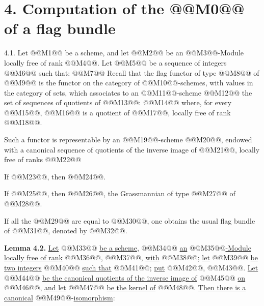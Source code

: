 \section*{4. Computation of the @@M0@@ of a flag bundle}

4.1.
Let @@M1@@ be a scheme, and let @@M2@@ be an @@M3@@-Module locally free of rank @@M4@@. Let @@M5@@ be a sequence of integers @@M6@@ such that:
@@M7@@
Recall that the flag functor of type @@M8@@ of @@M9@@ is the functor on the category of @@M10@@-schemes, with values in the category of sets, which associates to an @@M11@@-scheme @@M12@@ the set of sequences of quotients of @@M13@@:
@@M14@@
where, for every @@M15@@, @@M16@@ is a quotient of @@M17@@, locally free of rank @@M18@@.

Such a functor is representable by an @@M19@@-scheme @@M20@@, endowed with a canonical sequence of quotients of the inverse image of @@M21@@, locally free of ranks @@M22@@

If @@M23@@, then @@M24@@.

If @@M25@@, then @@M26@@, the Grassmannian of type @@M27@@ of @@M28@@.

If all the @@M29@@ are equal to @@M30@@, one obtains the usual flag bundle of @@M31@@, denoted by @@M32@@.

\textbf{Lemma 4.2.} \uline{Let} @@M33@@ \uline{be a scheme}, @@M34@@ \uline{an} @@M35@@\uline{-Module locally free of rank} @@M36@@, @@M37@@, \uline{with} @@M38@@; \uline{let} @@M39@@ \uline{be two integers} @@M40@@ \uline{such that} @@M41@@; \uline{put} @@M42@@, @@M43@@. \uline{Let} @@M44@@ \uline{be the canonical quotients of the inverse image of} @@M45@@ \uline{on} @@M46@@, \uline{and let} @@M47@@ \uline{be the kernel of} @@M48@@. \uline{Then there is a canonical} @@M49@@-\uline{isomorphism}:
